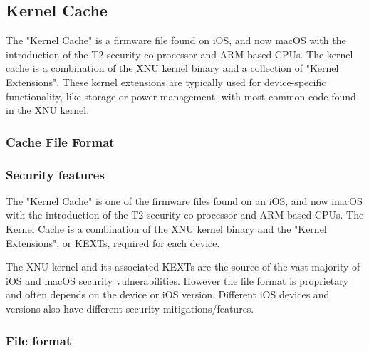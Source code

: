 \subsection{Kernel Cache}


The "Kernel Cache" is a firmware file found on iOS, and now macOS with the introduction of the T2 security co-processor and ARM-based CPUs. The kernel cache is a combination of the XNU kernel binary and a collection of "Kernel Extensions". These kernel extensions are typically used for device-specific functionality, like storage or power management, with most common code found in the XNU kernel.



\subsubsection{Cache File Format}





\subsubsection{Security features}









The "Kernel Cache" is one of the firmware files found on an iOS, and now macOS with the introduction of the T2 security co-processor and ARM-based CPUs. The Kernel Cache is a combination of the XNU kernel binary and the "Kernel Extensions", or KEXTs, required for each device.\cite{kcache-iphonewiki}

The XNU kernel and its associated KEXTs are the source of the vast majority of iOS and macOS security vulnerabilities. However the file format is proprietary and often depends on the device or iOS version. Different iOS devices and versions also have different security mitigations/features. 

\subsubsection{File format}

